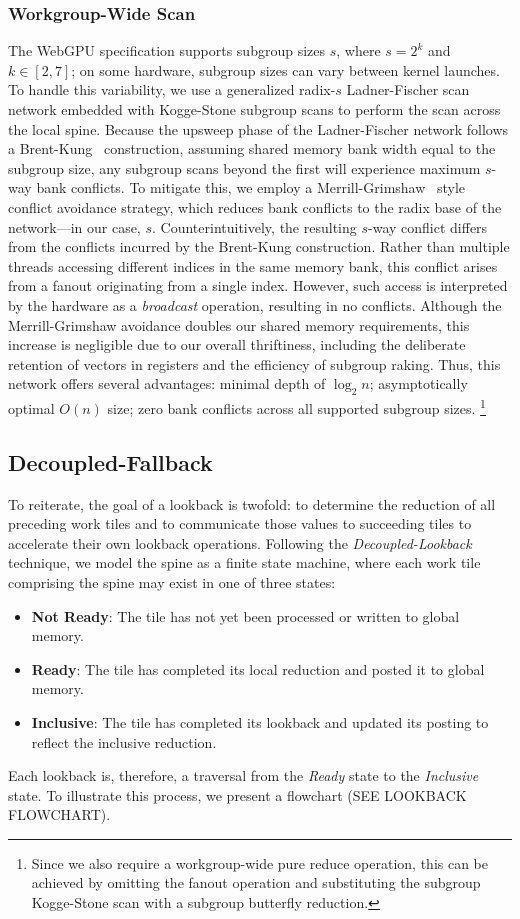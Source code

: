 \documentclass[sigconf]{acmart}
\begin{document}
\subsubsection{Workgroup-Wide Scan}
The WebGPU specification supports subgroup sizes $s$, where $s = 2^k$ and $k \in [2, 7]$; on some hardware, subgroup sizes can vary between kernel launches. To handle this variability, we use a generalized radix-$s$ Ladner-Fischer scan network embedded with Kogge-Stone subgroup scans to perform the scan across the local spine. Because the upsweep phase of the Ladner-Fischer network follows a Brent-Kung~\cite{1675982} construction, assuming shared memory bank width equal to the subgroup size, any subgroup scans beyond the first will experience maximum $s$-way bank conflicts. To mitigate this, we employ a Merrill-Grimshaw~\cite[Section 3.3.5]{Merrill2009} style conflict avoidance strategy, which reduces bank conflicts to the radix base of the network—in our case, $s$. Counterintuitively, the resulting $s$-way conflict differs from the conflicts incurred by the Brent-Kung construction. Rather than multiple threads accessing different indices in the same memory bank, this conflict arises from a fanout originating from a single index. However, such access is interpreted by the hardware as a \emph{broadcast} operation, resulting in no conflicts. Although the Merrill-Grimshaw avoidance doubles our shared memory requirements, this increase is negligible due to our overall thriftiness, including the deliberate retention of vectors in registers and the efficiency of subgroup raking. Thus, this network offers several advantages: minimal depth of $\log_2 n$; asymptotically optimal $O(n)$ size; zero bank conflicts across all supported subgroup sizes. \footnote{Since we also require a workgroup-wide pure reduce operation, this can be achieved by omitting the fanout operation and substituting the subgroup Kogge-Stone scan with a subgroup butterfly reduction.}

\subsection{Decoupled-Fallback}
To reiterate, the goal of a lookback is twofold: to determine the reduction of all preceding work tiles and to communicate those values to succeeding tiles to accelerate their own lookback operations. Following the \emph{Decoupled-Lookback} technique, we model the spine as a finite state machine, where each work tile comprising the spine may exist in one of three states:
\begin{itemize}
  \item \textbf{Not Ready}: The tile has not yet been processed or written to global memory.
  \item \textbf{Ready}: The tile has completed its local reduction and posted it to global memory.
  \item \textbf{Inclusive}: The tile has completed its lookback and updated its posting to reflect the inclusive reduction.
\end{itemize}
Each lookback is, therefore, a traversal from the \emph{Ready} state to the \emph{Inclusive} state. To illustrate this process, we present a flowchart (SEE LOOKBACK FLOWCHART).
\end{document}
